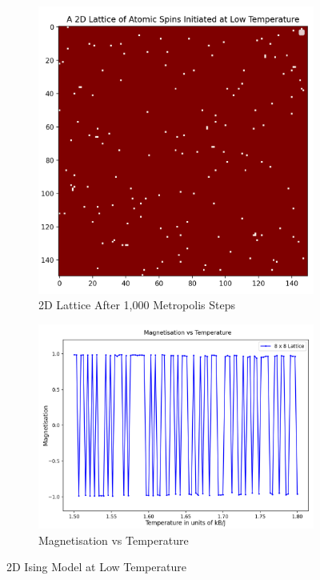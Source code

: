 \documentclass[a4paper]{article}
\begin{document}
\begin{figure}[h]
\centering
\begin{subfigure}{0.4\textwidth}
\includegraphics[width=1\linewidth]{2D Low Temperature.png} 
\caption{2D Lattice After 1,000 Metropolis Steps}
\label{fig:subim1}
\end{subfigure}
\begin{subfigure}{0.5\textwidth}
\includegraphics[width=1.1\linewidth,left]{mag vs temp for low temp.png}
\caption{Magnetisation vs Temperature}
\label{fig:subim2}
\end{subfigure}
\caption{2D Ising Model at Low Temperature}
\label{fig:image2}
\end{figure}
\end{document}
